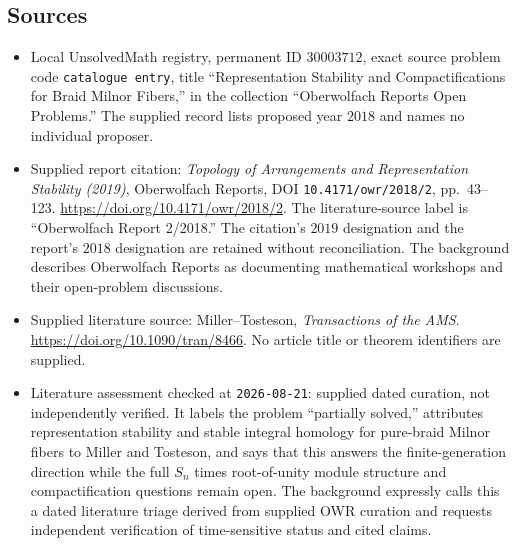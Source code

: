 \documentclass[11pt]{article}
\begin{document}
\subsection{Sources}
\begin{itemize}
\item Local UnsolvedMath registry, permanent ID \(30003712\), exact source problem code \texttt{catalogue entry}, title ``Representation Stability and Compactifications for Braid Milnor Fibers,'' in the collection ``Oberwolfach Reports Open Problems.'' The supplied record lists proposed year \(2018\) and names no individual proposer.
\item Supplied report citation: \emph{Topology of Arrangements and Representation Stability (2019)}, Oberwolfach Reports, DOI \texttt{10.4171/owr/2018/2}, pp.\ 43--123. \url{https://doi.org/10.4171/owr/2018/2}. The literature-source label is ``Oberwolfach Report 2/2018.'' The citation's \(2019\) designation and the report's \(2018\) designation are retained without reconciliation. The background describes Oberwolfach Reports as documenting mathematical workshops and their open-problem discussions.
\item Supplied literature source: Miller--Tosteson, \emph{Transactions of the AMS}. \url{https://doi.org/10.1090/tran/8466}. No article title or theorem identifiers are supplied.
\item Literature assessment checked at \texttt{2026-08-21}: supplied dated curation, not independently verified. It labels the problem ``partially solved,'' attributes representation stability and stable integral homology for pure-braid Milnor fibers to Miller and Tosteson, and says that this answers the finite-generation direction while the full \(S_n\) times root-of-unity module structure and compactification questions remain open. The background expressly calls this a dated literature triage derived from supplied OWR curation and requests independent verification of time-sensitive status and cited claims.
\end{itemize}
\end{document}

